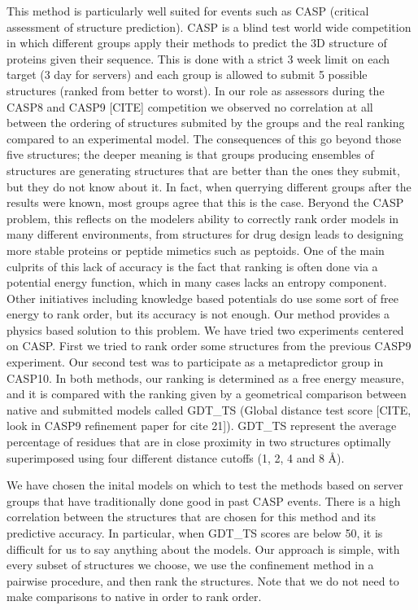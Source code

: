 \documentclass[12pt]{article}
\begin{document}
This method is particularly well suited for events such as CASP (critical assessment of structure
prediction). CASP is a blind test world wide competition in which different groups apply their
methods to predict the 3D structure of proteins given their sequence. This is done with a strict 3
week limit on each target (3 day for servers) and each group is allowed to submit 5 possible
structures (ranked from better to worst). In our role as assessors during the CASP8 and CASP9 [CITE]
competition we observed no correlation at all between the ordering of structures submited by the
groups and the real ranking compared to an experimental model. The consequences of this go beyond
those five structures; the deeper meaning is that groups producing ensembles of structures are
generating structures that are better than the ones they submit, but they do not know about it. In
fact, when querrying different groups after the results were known, most groups agree that this is
the case. Beryond the CASP problem, this reflects on the modelers ability to correctly rank order
models in many different environments, from structures for drug design leads to designing more
stable proteins or peptide mimetics such as peptoids. One of the main culprits of this lack of
accuracy is the fact that ranking is often done via a potential energy function, which in many cases
lacks an entropy component. Other initiatives including knowledge based potentials do use some sort
of free energy to rank order, but its accuracy is not enough. Our method provides a physics based
solution to this problem. We have tried two experiments centered on CASP. First we tried to rank
order some structures from the previous CASP9 experiment. Our second test was to participate as a
metapredictor group in CASP10. In both methods, our ranking is determined as a free energy measure,
and it is compared with the ranking given by a geometrical comparison between native and submitted
models called GDT\_TS (Global distance test score [CITE, look in CASP9 refinement paper for cite
21]). GDT\_TS represent the average percentage of residues that are in close proximity in two
structures optimally superimposed using four different distance cutoffs (1, 2, 4 and 8 Å).

We have chosen the inital models on which to test the methods based on server groups that have
traditionally done good in past CASP events. There is a high correlation between the structures that
are chosen for this method and its predictive accuracy. In particular, when GDT\_TS scores are below
50, it is difficult for us to say anything about the models. Our approach is simple, with every
subset of structures we choose, we use the confinement method in a pairwise procedure, and then rank
the structures. Note that we do not need to make comparisons to native in order to rank order.
\end{document}
